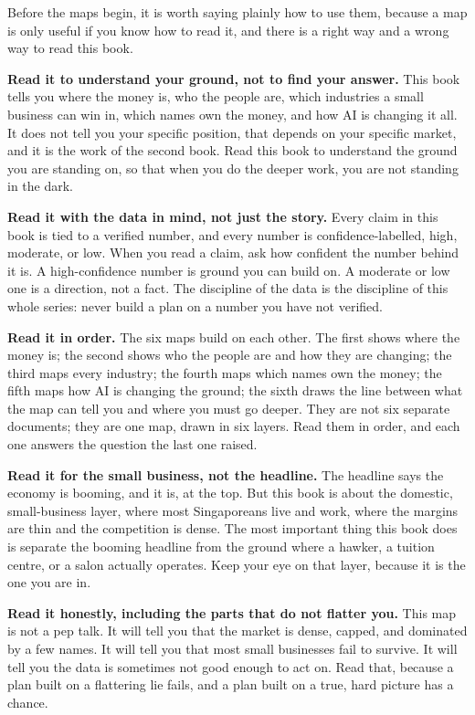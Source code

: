 \documentclass[10pt,twoside,openany]{memoir}
\begin{document}
Before the maps begin, it is worth saying plainly how to use them,
because a map is only useful if you know how to read it, and there is a
right way and a wrong way to read this book.

\textbf{Read it to understand your ground, not to find your answer.}
This book tells you where the money is, who the people are, which
industries a small business can win in, which names own the money, and
how AI is changing it all. It does not tell you your specific position,
that depends on your specific market, and it is the work of the second
book. Read this book to understand the ground you are standing on, so
that when you do the deeper work, you are not standing in the dark.

\textbf{Read it with the data in mind, not just the story.} Every claim
in this book is tied to a verified number, and every number is
confidence-labelled, high, moderate, or low. When you read a claim, ask
how confident the number behind it is. A high-confidence number is
ground you can build on. A moderate or low one is a direction, not a
fact. The discipline of the data is the discipline of this whole series:
never build a plan on a number you have not verified.

\textbf{Read it in order.} The six maps build on each other. The first
shows where the money is; the second shows who the people are and how
they are changing; the third maps every industry; the fourth maps which
names own the money; the fifth maps how AI is changing the ground; the
sixth draws the line between what the map can tell you and where you
must go deeper. They are not six separate documents; they are one map,
drawn in six layers. Read them in order, and each one answers the
question the last one raised.

\textbf{Read it for the small business, not the headline.} The headline
says the economy is booming, and it is, at the top. But this book is
about the domestic, small-business layer, where most Singaporeans live
and work, where the margins are thin and the competition is dense. The
most important thing this book does is separate the booming headline
from the ground where a hawker, a tuition centre, or a salon actually
operates. Keep your eye on that layer, because it is the one you are in.

\textbf{Read it honestly, including the parts that do not flatter you.}
This map is not a pep talk. It will tell you that the market is dense,
capped, and dominated by a few names. It will tell you that most small
businesses fail to survive. It will tell you the data is sometimes not
good enough to act on. Read that, because a plan built on a flattering
lie fails, and a plan built on a true, hard picture has a chance.
\end{document}
